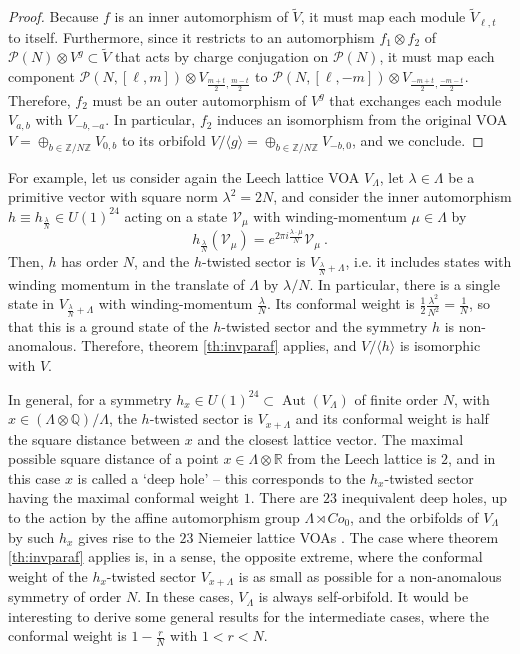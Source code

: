 \documentclass[11pt,reqno]{article}
\newcommand{\be}{\begin{equation}}
\newcommand{\ee}{\end{equation}}
\newcommand{\CV}{\mathcal{V}}
\DeclareMathOperator{\Aut}{Aut}
\newcommand{\ZZ}{\mathbb{Z}}
\newcommand{\RR}{\mathbb{R}}
\newcommand{\QQ}{\mathbb{Q}}
\newcommand{\paraf}{\mathcal{P}}
\begin{document}
\begin{proof}
Because $f$ is an inner automorphism of $\tilde V$, it must map each module $\tilde V_{\ell,t}$ to itself. Furthermore, since it restricts to an automorphism $f_1\otimes f_2$ of $\paraf(N)\otimes V^g\subset \tilde V$ that acts by charge conjugation on $\paraf(N)$, it must map each component $\paraf(N,[\ell,m])\otimes V_{\frac{m+t}{2},\frac{m-t}{2}}$ to  $\paraf(N,[\ell,-m])\otimes V_{\frac{-m+t}{2},\frac{-m-t}{2}}$. Therefore, $f_2$ must be an outer automorphism of $V^g$ that exchanges each module $V_{a,b}$ with $V_{-b,-a}$. In particular, $f_2$ induces an isomorphism from the original VOA $V=\oplus_{b\in \ZZ/N\ZZ} V_{0,b}$ to its orbifold  $V/\langle g\rangle=\oplus_{b\in \ZZ/N\ZZ} V_{-b,0}$, and we conclude.  \end{proof}

For example, let us consider again the Leech lattice VOA $V_\Lambda$, let $\lambda\in \Lambda$ be a primitive vector with square norm $\lambda^2=2N$, and consider the inner automorphism $h\equiv h_{\frac{\lambda}{N}}\in U(1)^{24}$ acting on a state $\CV_\mu$ with winding-momentum $\mu\in \Lambda$ by
\be h_{\frac{\lambda}{N}}(\CV_\mu)=e^{2\pi i \frac{\lambda\cdot\mu}{N}}\CV_\mu\ .
\ee Then, $h$ has order $N$, and the $h$-twisted sector is $V_{\frac{\lambda}{N}+\Lambda}$, i.e. it includes states with winding momentum in the translate of $\Lambda$ by $\lambda/N$. In particular, there is a single state in $V_{\frac{\lambda}{N}+\Lambda}$ with winding-momentum $\frac{\lambda}{N}$. Its conformal weight is $\frac{1}{2}\frac{\lambda^2}{N^2}=\frac{1}{N}$, so that this is a ground state of the $h$-twisted sector and the symmetry $h$ is non-anomalous. Therefore, theorem \ref{th:invparaf} applies, and $V/\langle h\rangle$ is isomorphic with $V$. 

In general, for a symmetry $h_x\in U(1)^{24}\subset \Aut(V_\Lambda)$ of finite order $N$, with $x\in (\Lambda\otimes\QQ)/\Lambda$, the $h$-twisted sector is $V_{x+\Lambda}$ and its conformal weight is half the square distance between $x$ and the closest lattice vector. The maximal possible square distance of a point $x\in \Lambda\otimes\RR$ from the Leech lattice is $2$, and in this case $x$ is called a `deep hole' -- this corresponds to the $h_x$-twisted sector having the maximal conformal weight $1$. There are $23$ inequivalent deep holes, up to the action by the affine automorphism group $\Lambda\rtimes Co_0$, and the orbifolds of $V_\Lambda$ by such $h_x$ gives rise to the $23$ Niemeier lattice VOAs \cite{MollerScheithauer2023}. The case where theorem \ref{th:invparaf} applies is, in a sense, the opposite extreme, where the conformal weight of the $h_x$-twisted sector $V_{x+\Lambda}$ is as small as possible for a non-anomalous symmetry of order $N$. In these cases, $V_\Lambda$ is always self-orbifold. It would be interesting to derive some general results for the intermediate cases, where the conformal weight is $1-\frac{r}{N}$ with $1<r<N$.
\end{document}
